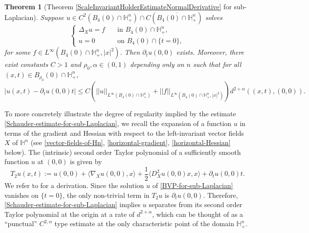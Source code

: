 \documentclass[12pt]{amsart}
\newtheorem*{theorem*}{Theorem}
\def \H {{\mathbb H}}
\def \a {\alpha}
\begin{document}
\begin{theorem*}[Theorem \ref{ScaleInvariantHolderEstimateNormalDerivative} for sub-Laplacian]
Suppose $u \in C^2(B_{4}(0)\cap \H^n_+) \cap C(\overline{B_{4}(0)\cap \H^n_+})$ solves
\begin{equation}\label{BVP-for-sub-Laplacian}
\begin{cases}
\Delta_Xu = f & \quad \text{in } B_{4}(0)\cap \H^n_+, \\
u = 0 & \quad \text{on } B_{4}(0)\cap \{t=0\},
\end{cases}
\end{equation}
for some $f \in L^{\infty}(B_{4}(0)\cap \H^n_+,|x|^2)$. Then $\partial_t u(0,0)$ exists. Moreover, there exist constants $C > 1$ and $\rho_0, \a \in(0,1)$ depending only on $n$ such that for all $(x,t) \in B_{\rho_0}(0)\cap \H^n_+$,
\begin{equation}\label{Schauder-estimate-for-sub-Laplacian}
|u(x,t) - \partial_t u(0,0) t| \leq C\left( ||u||_{L^{\infty}(B_{4}(0)\cap \H^n_+)}  + ||f||_{L^{\infty}(B_{4}(0)\cap \H^n_+,|x|^{2})} \right) d^{2+\alpha}((x,t),(0,0)).
\end{equation}
\end{theorem*}

To more concretely illustrate the degree of regularity implied by the estimate \eqref{Schauder-estimate-for-sub-Laplacian}, we recall the expansion of a function $u$ in terms of the gradient and Hessian with respect to the left-invariant vector fields $X$ of $\H^n$ (see \eqref{vector-fields-of-Hn}, \eqref{horizontal-gradient}, \eqref{horizontal-Hessian} below). The (intrinsic) second order Taylor polynomial of a sufficiently smooth function $u$ at $(0,0)$ is given by
$$T_2 u(x,t):=u(0,0)+\langle \nabla_Xu(0,0),x\rangle + \frac{1}{2}\langle D^2_Xu(0,0) x,x \rangle + \partial_t u(0,0) t.$$
We refer to \cite[formula (20.24)]{BLU2007} for a derivation. Since the solution $u$ of \eqref{BVP-for-sub-Laplacian} vanishes on $\{t=0\}$, the only non-trivial term in $T_2 u$ is $\partial_t u(0,0)$. Therefore, \eqref{Schauder-estimate-for-sub-Laplacian} implies $u$ separates from its second order Taylor polynomial at the origin at a rate of $d^{2+\a}$, which can be thought of as a ``punctual'' $C^{2,\a}$ type estimate at the only characteristic point of the domain $\H^n_+$.
\end{document}
